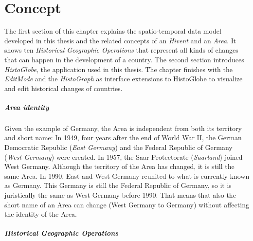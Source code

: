 
\chapter{Concept} %
\label{cha:concept}

The first section of this chapter explains the spatio-temporal data model developed in this thesis and the related concepts of an  \emph{Hivent} and an \emph{Area}. It shows ten \emph{Historical Geographic Operations} that represent all kinds of changes that can happen in the development of a country. The second section introduces \emph{HistoGlobe}, the application used in this thesis. The chapter finishes with the \emph{EditMode} and the \emph{HistoGraph} as interface extensions to HistoGlobe to visualize and edit historical changes of countries.

\paragraph{Area identity} %
\label{par:area_identity}

Given the example of Germany, the Area is independent from both its territory and short name: In 1949, four years after the end of World War II, the German Democratic Republic (\emph{East Germany}) and the Federal Republic of Germany (\emph{West Germany}) were created. In 1957, the Saar Protectorate (\emph{Saarland}) joined West Germany. Although the territory of the Area has changed, it is still the same Area. In 1990, East and West Germany reunited to what is currently known as Germany. This Germany is still the Federal Republic of Germany, so it is juristically the same as West Germany before 1990. That means that also the short name of an Area can change (West Germany to Germany) without affecting the identity of the Area.



\paragraph{Historical Geographic Operations} %
\label{par:historical_geographic_operations}


